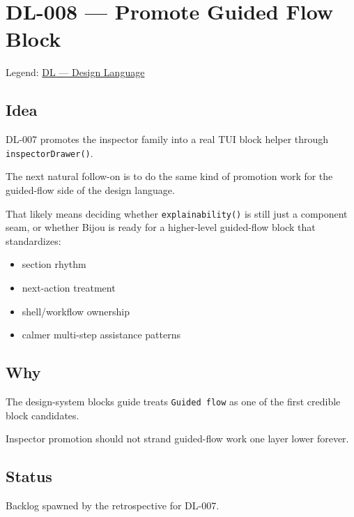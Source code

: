 \chapter{DL-008 --- Promote Guided Flow Block}\label{record-295}

\smallskip

Legend: \href{https://github.com/flyingrobots/bijou/blob/cbd70612140e7a450d764b3c7be1c6af878b99bc/docs/method/graveyard/legends/DL-design-language.md}{DL --- Design Language}

\section{Idea}\label{record-295-idea}

DL-007 promotes the inspector family into a real TUI block helper through \texttt{i\allowbreak{}n\allowbreak{}s\allowbreak{}p\allowbreak{}e\allowbreak{}c\allowbreak{}t\allowbreak{}o\allowbreak{}r\allowbreak{}D\allowbreak{}r\allowbreak{}a\allowbreak{}w\allowbreak{}e\allowbreak{}r\allowbreak{}(\allowbreak{})}.

The next natural follow-on is to do the same kind of promotion work for the guided-flow side of the design language.

That likely means deciding whether \texttt{e\allowbreak{}x\allowbreak{}p\allowbreak{}l\allowbreak{}a\allowbreak{}i\allowbreak{}n\allowbreak{}a\allowbreak{}b\allowbreak{}i\allowbreak{}l\allowbreak{}i\allowbreak{}t\allowbreak{}y\allowbreak{}(\allowbreak{})} is still just a component seam, or whether Bijou is ready for a higher-level guided-flow block that standardizes:

\begin{itemize}
\tightlist
\item
  section rhythm
\item
  next-action treatment
\item
  shell/workflow ownership
\item
  calmer multi-step assistance patterns
\end{itemize}

\section{Why}\label{record-295-why}

The design-system blocks guide treats \texttt{G\allowbreak{}u\allowbreak{}i\allowbreak{}d\allowbreak{}e\allowbreak{}d\allowbreak{} \allowbreak{}f\allowbreak{}l\allowbreak{}o\allowbreak{}w} as one of the first credible block candidates.

Inspector promotion should not strand guided-flow work one layer lower forever.

\section{Status}\label{record-295-status}

Backlog spawned by the retrospective for DL-007.

